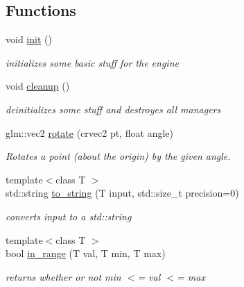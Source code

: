 \subsection*{Functions}
\begin{DoxyCompactItemize}
\item 
\mbox{\label{namespacenta_a416e1430bb187e7a122f2729f96b1e58}} 
void \hyperlink{namespacenta_a416e1430bb187e7a122f2729f96b1e58}{init} ()
\begin{DoxyCompactList}\small\item\em initializes some basic stuff for the engine \end{DoxyCompactList}\item 
\mbox{\label{namespacenta_a17dc16b021d0dec3749e422b95d39350}} 
void \hyperlink{namespacenta_a17dc16b021d0dec3749e422b95d39350}{cleanup} ()
\begin{DoxyCompactList}\small\item\em deinitializes some stuff and destroyes all managers \end{DoxyCompactList}\item 
\mbox{\label{namespacenta_ada7b30da347b63962acfdc8f16c1ffb8}} 
glm\+::vec2 \hyperlink{namespacenta_ada7b30da347b63962acfdc8f16c1ffb8}{rotate} (crvec2 pt, float angle)
\begin{DoxyCompactList}\small\item\em Rotates a point (about the origin) by the given angle. \end{DoxyCompactList}\item 
\mbox{\label{namespacenta_a7521a21e7957d0b80c6c54eb2a80d63d}} 
{\footnotesize template$<$class T $>$ }\\std\+::string \hyperlink{namespacenta_a7521a21e7957d0b80c6c54eb2a80d63d}{to\+\_\+string} (T input, std\+::size\+\_\+t precision=0)
\begin{DoxyCompactList}\small\item\em converts input to a std\+::string \end{DoxyCompactList}\item 
\mbox{\label{namespacenta_a5c6b09bba75d5132dad154b02fee6727}} 
{\footnotesize template$<$class T $>$ }\\bool \hyperlink{namespacenta_a5c6b09bba75d5132dad154b02fee6727}{in\+\_\+range} (T val, T min, T max)
\begin{DoxyCompactList}\small\item\em returns whether or not min $<$= val $<$= max \end{DoxyCompactList}\end{DoxyCompactItemize}


